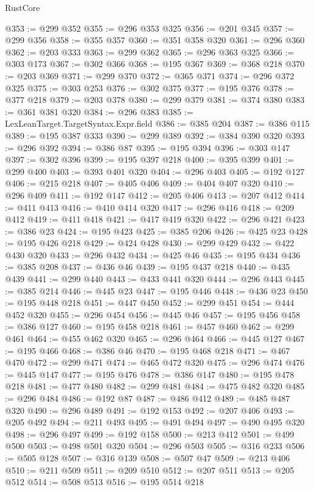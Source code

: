 \begin{lexlean}{RustCore}
\begin{coremodule}
@353 := @299 @352
@355 := @296 @353 @325
@356 := @201 @345
@357 := @299 @356
@358 := @355 @357
@360 := @351 @358 @320
@361 := @296 @360
@362 := @203 @333
@363 := @299 @362
@365 := @296 @363 @325
@366 := @303 @173
@367 := @302 @366
@368 := @195 @367
@369 := @368 @218
@370 := @203 @369
@371 := @299 @370
@372 := @365 @371
@374 := @296 @372 @325
@375 := @303 @253
@376 := @302 @375
@377 := @195 @376
@378 := @377 @218
@379 := @203 @378
@380 := @299 @379
@381 := @374 @380
@383 := @361 @381 @320
@384 := @296 @383
@385 := LexLeanTarget.TargetSyntax.Expr.field
@386 := @385 @204
@387 := @386 @115
@389 := @195 @387 @333
@390 := @299 @389
@392 := @384 @390 @320
@393 := @296 @392
@394 := @386 @87
@395 := @195 @394
@396 := @303 @147
@397 := @302 @396
@399 := @195 @397 @218
@400 := @395 @399
@401 := @299 @400
@403 := @393 @401 @320
@404 := @296 @403
@405 := @192 @127
@406 := @215 @218
@407 := @405 @406
@409 := @404 @407 @320
@410 := @296 @409
@411 := @192 @147
@412 := @205 @406
@413 := @207 @412
@414 := @411 @413
@416 := @410 @414 @320
@417 := @296 @416
@418 := @209 @412
@419 := @411 @418
@421 := @417 @419 @320
@422 := @296 @421
@423 := @386 @23
@424 := @195 @423
@425 := @385 @206
@426 := @425 @23
@428 := @195 @426 @218
@429 := @424 @428
@430 := @299 @429
@432 := @422 @430 @320
@433 := @296 @432
@434 := @425 @46
@435 := @195 @434
@436 := @385 @208
@437 := @436 @46
@439 := @195 @437 @218
@440 := @435 @439
@441 := @299 @440
@443 := @433 @441 @320
@444 := @296 @443
@445 := @385 @214
@446 := @445 @23
@447 := @195 @446
@448 := @436 @23
@450 := @195 @448 @218
@451 := @447 @450
@452 := @299 @451
@454 := @444 @452 @320
@455 := @296 @454
@456 := @445 @46
@457 := @195 @456
@458 := @386 @127
@460 := @195 @458 @218
@461 := @457 @460
@462 := @299 @461
@464 := @455 @462 @320
@465 := @296 @464
@466 := @445 @127
@467 := @195 @466
@468 := @386 @46
@470 := @195 @468 @218
@471 := @467 @470
@472 := @299 @471
@474 := @465 @472 @320
@475 := @296 @474
@476 := @445 @147
@477 := @195 @476
@478 := @386 @147
@480 := @195 @478 @218
@481 := @477 @480
@482 := @299 @481
@484 := @475 @482 @320
@485 := @296 @484
@486 := @192 @87
@487 := @486 @412
@489 := @485 @487 @320
@490 := @296 @489
@491 := @192 @153
@492 := @207 @406
@493 := @205 @492
@494 := @211 @493
@495 := @491 @494
@497 := @490 @495 @320
@498 := @296 @497
@499 := @192 @158
@500 := @213 @412
@501 := @499 @500
@503 := @498 @501 @320
@504 := @296 @503
@505 := @316 @233
@506 := @505 @128
@507 := @316 @139
@508 := @507 @47
@509 := @213 @406
@510 := @211 @509
@511 := @209 @510
@512 := @207 @511
@513 := @205 @512
@514 := @508 @513
@516 := @195 @514 @218

\end{coremodule}
\end{lexlean}
